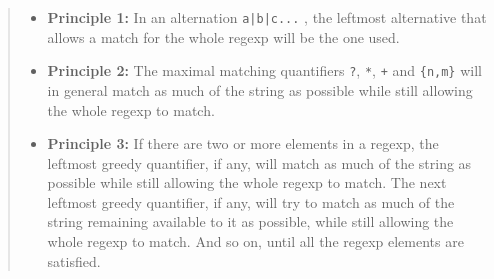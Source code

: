\begin{it}
\begin{quotation}
\begin{itemize}
      {\bf Principle 0:} Taken as a whole, any regexp will be matched at the earliest possible position in the string.
    \item

      {\bf Principle 1:} In an alternation \verb#a|b|c...# , the leftmost alternative that allows a match for the whole regexp will be the one used.
    \item

      {\bf Principle 2:} The maximal matching quantifiers \verb|?|, \verb|*|, \verb|+| and \verb|{n,m}| 
                   will in general match as much of the string as possible while still allowing the whole regexp to match.
    \item
      {\bf Principle 3:} If there are two or more elements in a regexp, the leftmost greedy quantifier, 
                   if any, will match as much of the string as possible while still allowing the whole regexp to match. 
                   The next leftmost greedy quantifier, if any, will try to match as much of 
                   the string remaining available to it as possible, while still allowing 
                   the whole regexp to match. And so on, until all the regexp elements are satisfied.
\end{itemize}

\end{quotation}
\end{it}


